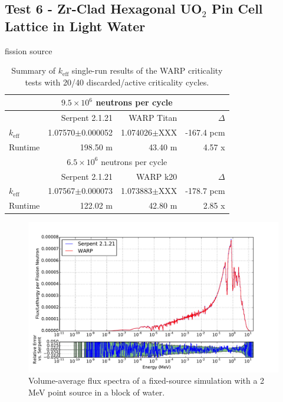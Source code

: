 \documentclass[preprint,12pt]{elsarticle}
\begin{document}
\subsection{Test 6 - Zr-Clad Hexagonal UO$_2$ Pin Cell Lattice in Light Water}

fission source

\begin{table}[h]
\centering
\caption{Summary of $k_\mathrm{eff}$ single-run results of the WARP criticality tests with 20/40 discarded/active criticality cycles.}
\label{assembly-lw_table}
\small
\begin{tabular}{| l | r | r | r |}
\hline
\multicolumn{4}{|c|}{$9.5\times10^6$ neutrons per cycle} \\
\hline
                  & Serpent 2.1.21       & WARP Titan               & $\Delta$ \\
\hline
$k_\mathrm{eff}$  & 1.07570$\pm$0.000052 & 1.074026$\pm$XXX         & -167.4 pcm \\
\hline
Runtime           & 198.50 m             & 43.40 m                  & 4.57 x \\
\hline
\hline
\multicolumn{4}{|c|}{$6.5\times10^6$ neutrons per cycle} \\
\hline
                  & Serpent 2.1.21       & WARP k20            & $\Delta$ \\
\hline
$k_\mathrm{eff}$  & 1.07567$\pm$0.000073 & 1.073883$\pm$XXX    & -178.7 pcm \\
\hline
Runtime           & 122.02 m             & 42.80 m             & 2.85 x\\
\hline
\end{tabular}
\end{table}


\begin{figure}[h!]
\centering
\includegraphics[width=\textwidth,trim= 1cm 0cm 1cm 0cm]{graphics/assembly-lw_spec.pdf}
\caption{Volume-average flux spectra of a fixed-source simulation with a 2 MeV point source in a block of water. \label{assembly-lw_spec} }
\end{figure}
\end{document}
